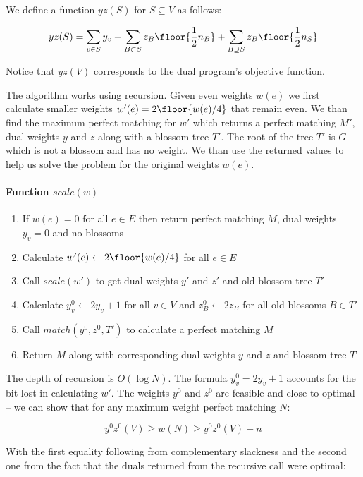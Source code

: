 We define a function $yz(S)$ for $S \subseteq V$ as follows:

\[
yz(S) = \sum_{v \in S} y_v + \sum_{B \subset S} z_B \floor{\frac{1}{2}n_B} + \sum_{B \supseteq S} z_B \floor{\frac{1}{2}n_S}
\]

Notice that $yz(V)$ corresponds to the dual program's objective function.

The algorithm works using recursion. Given even weights $w(e)$ we first calculate smaller weights $w'(e) = 2\floor{ w(e)/4 }$ that remain even. We than find the maximum perfect matching for $w'$ which returns a perfect matching $M'$, dual weights $y$ and $z$ along with a blossom tree $T'$. The root of the tree $T'$ is $G$ which is not a blossom and has no weight. We than use the returned values to help us solve the problem for the original weights $w(e)$.

\renewcommand{\labelenumi}{\textbf{\arabic{enumi}}.}
\paragraph*{Function $scale(w)$}
\begin{enumerate}
    \item If $w(e) = 0$ for all $e \in E$ then return perfect matching $M$, dual weights $y_v = 0$ and no blossoms
    \item Calculate $w'(e) \gets 2\floor{ w(e)/4 }$ for all $e \in E$
    \item Call $scale(w')$ to get dual weights $y'$ and $z'$ and old blossom tree $T'$
    \item Calculate $y^0_v \gets 2y_v + 1$ for all $v \in V$ and $z^0_B \gets 2z_B$ for all old blossoms $B \in T'$
    \item Call $match(y^0, z^0, T')$ to calculate a perfect matching $M$
    \item Return $M$ along with corresponding dual weights $y$ and $z$ and blossom tree $T$
\end{enumerate}

The depth of recursion is $O(\log N)$. The formula $y^0_v = 2y_v + 1$ accounts for the bit lost in calculating $w'$. The weights $y^0$ and $z^0$ are feasible and close to optimal – we can show that for any maximum weight perfect matching $N$:

\begin{equation}\label{eq:3}
    y^0z^0(V) \geq w(N) \geq y^0z^0(V) - n
\end{equation}

With the first equality following from complementary slackness and the second one from the fact that the duals returned from the recursive call were optimal:

